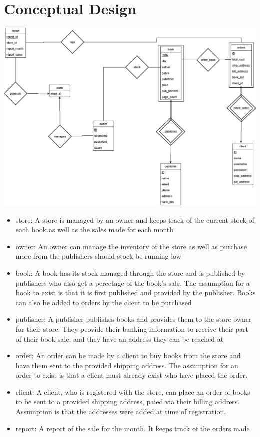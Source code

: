\documentclass[Project Report]{article}
\begin{document}
\section{Conceptual Design}
{\centering \includegraphics[width=\textwidth]{ER_Diagram.png}}
\begin{itemize}
    \item store: A store is managed by an owner and keeps track of the current stock of each book as well as the sales made for each month
    \item owner: An owner can manage the inventory of the store as well as purchase more from the publishers should stock be running low
    \item book: A book has its stock managed through the store and is published by publishers who also get a percetage of the book's sale. The assumption for a book to exist is that it is first published and provided by the publisher. Books can also be added to orders by the client to be purchased
    \item publisher: A publisher publishes books and provides them to the store owner for their store. They peovide their banking information to receive their part of their book sale, and they have an address they can be reached at
    \item order: An order can be made by a client to buy books from the store and have them sent to the provided shipping address. The assumption for an order to exist is that a client must already exist who have placed the order.
    \item client: A client, who is registered with the store, can place an order of books to be sent to a provided shipping address, paied via their billing address. Assumption is that the addresses were added at time of registration.
    \item report: A report of the sale for the month. It keeps track of the orders made 
\end{itemize}
\end{document}
